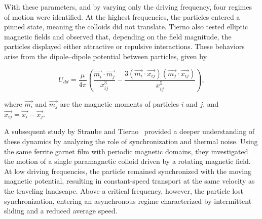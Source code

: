 With these parameters, and by varying only the driving frequency, four regimes of motion were identified. At the highest frequencies, the particles entered a pinned state, meaning the colloids did not translate. Tierno also tested elliptic magnetic fields and observed that, depending on the field magnitude, the particles displayed either attractive or repulsive interactions. These behaviors arise from the dipole–dipole potential between particles, given by

\begin{equation}
  U_{dd} = \frac{\mu}{4\pi} \left( \frac{\vec{m_i} \cdot \vec{m_j}}{x^3_{ij}} - \frac{3(\vec{m_i} \cdot \vec{x_{ij}})(\vec{m_j} \cdot \vec{x_{ij}})}{x^5_{ij}} \right),
\label{eq:dipolepairpotential}
\end{equation}

where $\vec{m_i}$ and $\vec{m_j}$ are the magnetic moments of particles $i$ and $j$, and $\vec{x_{ij}} = \vec{x_i} - \vec{x_j}$.

A subsequent study by Straube and Tierno~\cite{straube2013synchronous} provided a deeper understanding of these dynamics by analyzing the role of synchronization and thermal noise. Using the same ferrite garnet film with periodic magnetic domains, they investigated the motion of a single paramagnetic colloid driven by a rotating magnetic field. At low driving frequencies, the particle remained synchronized with the moving magnetic potential, resulting in constant-speed transport at the same velocity as the traveling landscape. Above a critical frequency, however, the particle lost synchronization, entering an asynchronous regime characterized by intermittent sliding and a reduced average speed.

